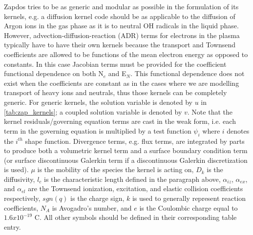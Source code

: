 Zapdos tries to be as generic and modular as possible in the formulation of its kernels, e.g. a diffusion kernel code should be as applicable to the diffusion of Argon ions in the gas phase as it is to neutral OH radicals in the liquid phase. However, advection-diffusion-reaction (ADR) terms for electrons in the plasma typically have to have their own kernels because the transport and Townsend coefficients are allowed to be functions of the mean electron energy as opposed to constants. In this case Jacobian terms must be provided for the coefficient functional dependence on both N$_e$ and E$_N$. This functional dependence does not exist when the coefficients are constant as in the cases where we are modelling transport of heavy ions and neutrals, thus those kernels can be completely generic. For generic kernels, the solution variable is denoted by $u$ in \cref{tab:zap_kernels}; a coupled solution variable is denoted by $v$. Note that the kernel residuals/governing equation terms are cast in the weak form, i.e. each term in the governing equation is multiplied by a test function $\psi_i$ where $i$ denotes the $i^{th}$ shape function. Divergence terms, e.g. flux terms, are integrated by parts to produce both a volumetric kernel term and a surface boundary condition term (or surface discontinuous Galerkin term if a discontinuous Galerkin discretization is used). $\mu$ is the mobility of the species the kernel is acting on, $D_k$ is the diffusivity, $l_c$ is the characteristic length defined in the paragraph above, $\alpha_{iz}$, $\alpha_{ex}$, and $\alpha_{el}$ are the Townsend ionization, excitation, and elastic collision coefficients respectively, $sgn(q)$ is the charge sign, $k$ is used to generally represent reaction coefficients, $N_A$ is Avogadro's number, and $e$ is the Coulombic charge equal to $1.6x10^{-19}$ C. All other symbols should be defined in their corresponding table entry.

